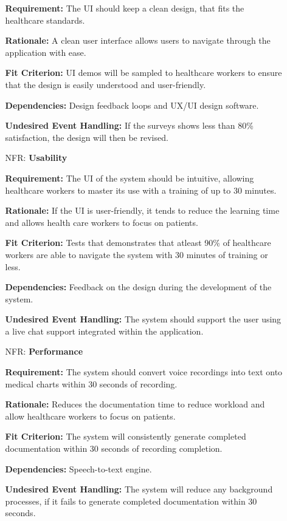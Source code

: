 \documentclass[12pt]{article}
\newcounter{nfrnum} %
\begin{document}
\begin{itemize}
\begin{itemize}
    \textbf{Requirement:} The UI should keep a clean design, that fits the healthcare standards.

    \textbf{Rationale:} A clean user interface allows users to navigate through the application with ease.

    \textbf{Fit Criterion:} UI demos will be sampled to healthcare workers to ensure that the design is easily understood and user-friendly.

    \textbf{Dependencies:} Design feedback loops and UX/UI design software.  

    \textbf{Undesired Event Handling:} If the surveys shows less than 80\% satisfaction, the design will then be revised.


\item[NFR\refstepcounter{nfrnum}\thenfrnum \label{NFR_Usability}:] \textbf{Usability}

    \textbf{Requirement:} The UI of the system should be intuitive, allowing healthcare workers to master its use with a training of up to 30 minutes. 

    \textbf{Rationale:} If the UI is user-friendly, it tends to reduce the learning time and allows health care workers to focus on patients.
  

    \textbf{Fit Criterion:} Tests that demonstrates that atleast 90\% of healthcare workers are able to navigate the system with 30 minutes of training or less.

    \textbf{Dependencies:} Feedback on the design during the development of the system.

    \textbf{Undesired Event Handling:} The system should support the user using a live chat support integrated within the application.

\item[NFR\refstepcounter{nfrnum}\thenfrnum \label{NFR_Performance}:] \textbf{Performance}

    \textbf{Requirement:} The system should convert voice recordings into text onto medical charts within 30 seconds of recording.

    \textbf{Rationale:} Reduces the documentation time to reduce workload and allow healthcare workers to focus on patients.
    
    \textbf{Fit Criterion:} The system will consistently generate completed documentation within 30 seconds of recording completion.  

    \textbf{Dependencies:} Speech-to-text engine.  

    \textbf{Undesired Event Handling:} The system will reduce any background processes, if it fails to generate completed documentation within 30 seconds.


\end{itemize}
\end{itemize}
\end{document}
